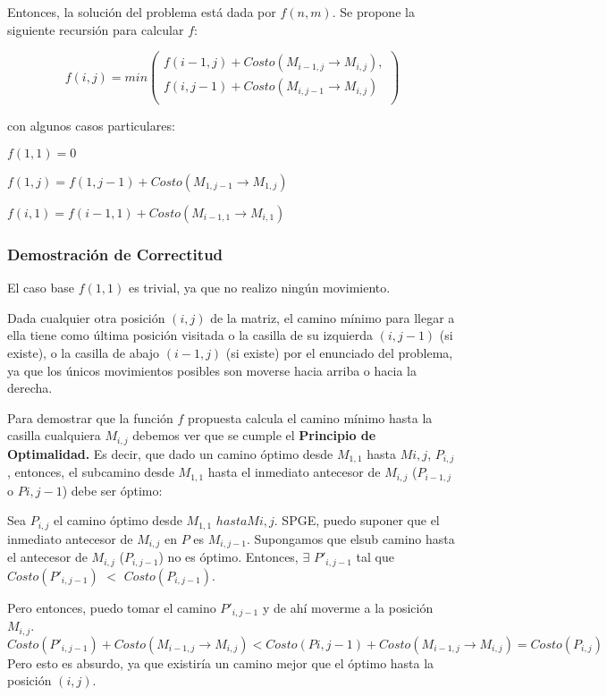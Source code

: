 Entonces, la solución del problema está dada por $f(n,m)$. 
Se propone la siguiente recursión para calcular $f$:

\begin{equation} \label{formulacionRecursiva}
f(i,j) = min \left( 
	\begin{array}{lr}
    f(i-1, j) + Costo(M_{i-1,j} \rightarrow M_{i,j}), \\
	f(i,j-1) + Costo(M_{i,j-1} \rightarrow M_{i,j}) \\
     \end{array}
   \right)
\end{equation}  

con algunos casos particulares:

$f(1,1) = 0 $

$f(1,j) = f(1,j-1) + Costo(M_{1,j-1} \rightarrow M_{1,j})$

$f(i,1) = f(i-1,1) + Costo(M_{i-1,1} \rightarrow M_{i,1})$

\subsubsection{Demostración de Correctitud}

El caso base $f(1,1)$ es trivial, ya que no realizo ningún movimiento.

Dada cualquier otra posición $(i,j)$ de la matriz, el camino mínimo para llegar a ella tiene como última posición visitada o la casilla de su izquierda $(i, j-1)$ (si existe), o la casilla de abajo $(i-1, j)$ (si existe) por el enunciado del problema, ya que los únicos movimientos posibles son moverse hacia arriba o hacia la derecha.

Para demostrar que la función $f$ propuesta calcula el camino mínimo hasta la casilla cualquiera $M_{i,j}$ debemos ver que se cumple el \textbf{Principio de Optimalidad.} Es decir, que dado un camino óptimo desde $M_{1,1}$ hasta $M{i,j}$, $P_{i,j}$, entonces, el subcamino desde $M_{1,1}$ hasta el inmediato antecesor de $M_{i,j}$ ($P_{i-1,j}$ o $P{i,j-1}$) debe ser óptimo: 

Sea $P_{i,j}$ el camino óptimo desde $M_{1,1}$ $hasta M{i,j}$.
SPGE, puedo suponer que el inmediato antecesor de $M_{i,j}$ en $P$ es $M_{i, j-1}$. Supongamos que elsub camino hasta el antecesor de $M_{i,j}$ ($P_{i,j-1}$)  no es óptimo. Entonces, $\exists$ $P\prime_{i,j-1}$ tal que $Costo(P\prime_{i,j-1})$ $<$ $Costo(P_{i,j-1})$.

Pero entonces, puedo tomar el camino  $P\prime_{i,j-1}$ y de ahí moverme a la posición $M_{i,j}$. 
$Costo (P\prime_{i,j-1}) + Costo(M_{i-1,j} \rightarrow M_{i,j}) < Costo (P{i,j-1}) + Costo(M_{i-1,j} \rightarrow M_{i,j}) = Costo(P_{i,j})$
Pero esto es absurdo, ya que existiría un camino mejor que el óptimo hasta la posición $(i,j)$.

